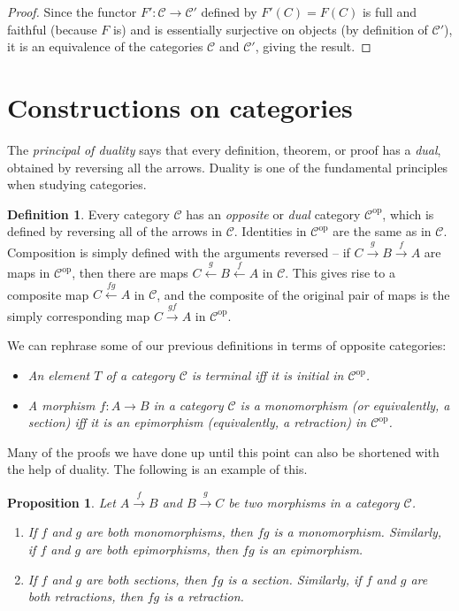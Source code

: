 \documentclass[10pt,oneside]{book}
\def\~#1{\mathscr{#1}}
\def\To#1{\xrightarrow{#1}}
\newcommand{\op}{\mathrm{op}}
\theoremstyle{plain}
\newtheorem{prop}[thm]{Proposition}
\theoremstyle{definition}
\newtheorem{defn}[thm]{Definition}
\theoremstyle{remark}
\numberwithin{equation}{section}
\numberwithin{figure}{section}
\begin{document}
\begin{proof}
    Since the functor $F': \~C \to \~C'$ defined by $F'(C) = F(C)$ is full and faithful (because $F$ is) and is essentially surjective on objects (by definition of $\~C'$), it is an equivalence of the categories $\~C$ and $\~C'$, giving the result.
\end{proof}

\section{Constructions on categories}


The \emph{principal of duality} says that every definition, theorem, or proof has a \emph{dual}, obtained by reversing all the arrows. Duality is one of the fundamental principles when studying categories. 

\begin{defn}
    Every category $\~C$ has an \emph{opposite} or \emph{dual} category $\~C^{\op}$, which is defined by reversing all of the arrows in $\~C$. Identities in $\~C^{\op}$ are the same as in $\~C$. Composition is simply defined with the arguments reversed -- if $C \To{g} B \To{f} A$ are maps in $\~C^{\op}$, then there are maps $C \xleftarrow{g} B \xleftarrow{f} A$ in $\~C$. This gives rise to a composite map $C \xleftarrow{fg} A$ in $\~C$, and the composite of the original pair of maps is the simply corresponding map $C \To{gf} A$ in $\~C^{\op}$.
\end{defn}

We can rephrase some of our previous definitions in terms of opposite categories:
\begin{itemize}
    \item \emph{An element $T$ of a category $\~C$ is terminal iff it is initial in $\~C^{\op}$.}

    \item \emph{A morphism $f: A \to B$ in a category $\~C$ is a monomorphism (or equivalently, a section) iff it is an epimorphism (equivalently, a retraction) in $\~C^{\op}$.}
\end{itemize}
Many of the proofs we have done up until this point can also be shortened with the help of duality. The following is an example of this.
\begin{prop}
Let $A \To{f} B$ and $B \To{g} C$ be two morphisms in a category $\~C$.
\begin{enumerate}[label=(\roman*)]
    \item If $f$ and $g$ are both monomorphisms, then $fg$ is a monomorphism. Similarly, if $f$ and $g$ are both epimorphisms, then $fg$ is an epimorphism.
    \item If $f$ and $g$ are both sections, then $fg$ is a section. Similarly, if $f$ and $g$ are both retractions, then $fg$ is a retraction.
\end{enumerate}
\end{prop}
\end{document}

